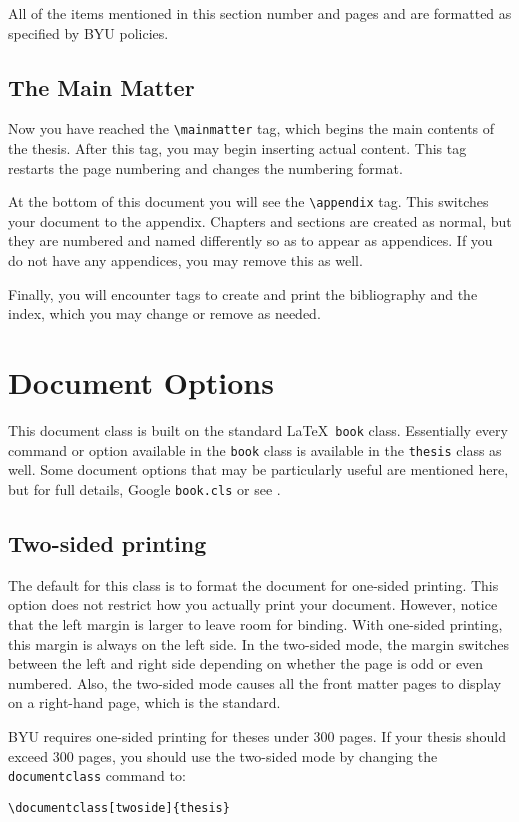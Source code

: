 \documentclass[12pt]{thesis}
\begin{document}
All of the items mentioned in this section number and pages and are formatted as specified by BYU policies.

\section{The Main Matter}
Now you have reached the \verb=\mainmatter= tag, which begins the main contents of the thesis. After this tag, you may begin inserting actual content. This tag restarts the page numbering and changes the numbering format.

At the bottom of this document you will see the \verb=\appendix= tag. This switches your document to the appendix. Chapters and sections are created as normal, but they are numbered and named differently so as to appear as appendices. If you do not have any appendices, you may remove this as well.

Finally, you will encounter tags to create and print the bibliography and the index, which you may change or remove as needed.

\chapter{Document Options}
This document class is built on the standard \LaTeX\ \texttt{book} class. Essentially every command or option available in the \texttt{book} class is available in the \texttt{thesis} class as well. Some document options that may be particularly useful are mentioned here, but for full details, Google \texttt{book.cls} or see \cite{lamport, goossens, computation-page}.

\section{Two-sided printing}
The default for this class is to format the document for one-sided printing. This option does not restrict how you actually print your document. However, notice that the left margin is larger to leave room for binding. With one-sided printing, this margin is always on the left side. In the two-sided mode, the margin switches between the left and right side depending on whether the page is odd or even numbered. Also, the two-sided mode causes all the front matter pages to display on a right-hand page, which is the standard.

BYU requires one-sided printing for theses under 300 pages. If your thesis should exceed 300 pages, you should use the two-sided mode by changing the \texttt{documentclass} command to:
\begin{verbatim}
\documentclass[twoside]{thesis}
\end{verbatim}
\end{document}
